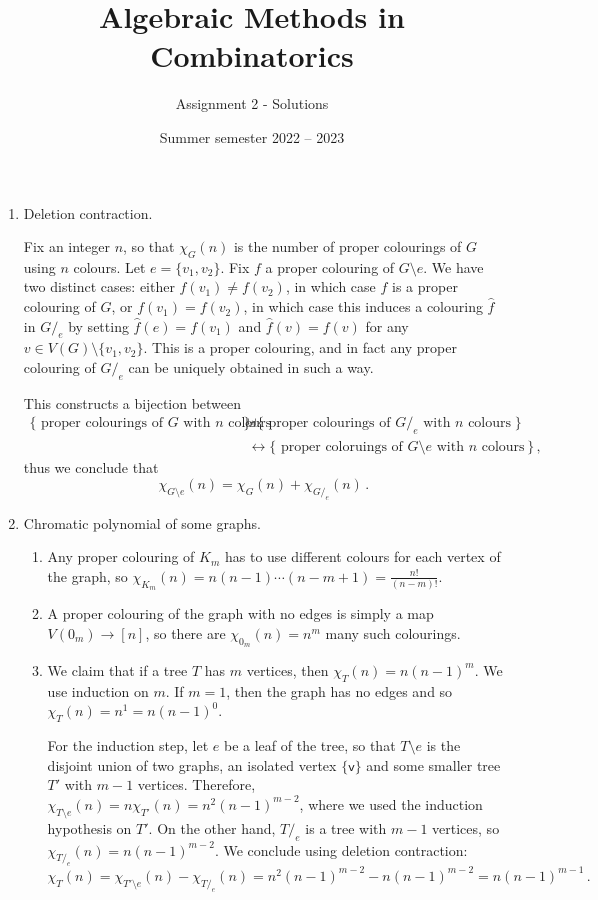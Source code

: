 \documentclass[kulak]{tplt}
\title{Algebraic Methods in Combinatorics}
\author{Assignment 2 - Solutions}
\date{Summer semester 2022 -- 2023}
\theoremstyle{definition}
\newcommand{\vv}{\mathsf{v}}
\begin{document}
\maketitle
\begin{enumerate}
\item Deletion contraction.

Fix an integer $n$, so that $\chi_G(n)$ is the number of proper colourings of $G$ using $n$ colours.
Let $e = \{v_1, v_2\}$.
Fix $f$ a proper colouring of $G\setminus e$.
We have two distinct cases: either $f(v_1) \neq f(v_2)$, in which case $f$ is a proper colouring of $G$, or $f(v_1) = f(v_2)$, in which case this induces a colouring $\hat{f}$ in $G/_e$ by setting $\hat{f}(e) = f(v_1)$ and $\hat{f}(v) = f(v)$ for any $v\in V(G) \setminus \{v_1, v_2\}$.
This is a proper colouring, and in fact any proper colouring of $G/_e$ can be uniquely obtained in such a way.

This constructs a bijection between
\begin{align*}
 \{ \text{ proper colourings of $G$ with $n$ colours }\} &\uplus \{ \text{ proper colourings of $G/_e$ with $n$ colours }\} \\
 &\leftrightarrow \{ \text{ proper coloruings of $G\setminus e$ with $n$ colours }\}\, , 
\end{align*}
thus we conclude that 
$$ \chi_{G\setminus e }(n) = \chi_G(n) + \chi_{G/_e}(n)\, . $$

\item Chromatic polynomial of some graphs.

\begin{enumerate}
\item 
Any proper colouring of $K_m$ has to use different colours for each vertex of the graph, so $\chi_{K_m}(n) = n(n-1) \cdots (n-m+1) = \frac{n!}{(n-m)!}$.

\item 
A proper colouring of the graph with no edges is simply a map $V(0_m) \to [n]$, so there are $\chi_{0_m}(n) = n^m$ many such colourings.


\item 
We claim that if a tree $T$ has $m$ vertices, then $\chi_T(n) = n(n-1)^m$.
We use induction on $m$.
If $m=1$, then the graph has no edges and so $\chi_T(n) = n^1 = n (n-1)^0$.

For the induction step, let $e$ be a leaf of the tree, so that $T\setminus e$ is the disjoint union of two graphs, an isolated vertex $\{\vv\}$ and some smaller tree $T'$ with $m-1$ vertices.
Therefore, $\chi_{T \setminus e}(n) = n \chi_{T'}(n) = n^2(n-1)^{m-2}$, where we used the induction hypothesis on $T'$.
On the other hand, $T/_e$ is a tree with $m-1$ vertices, so $\chi_{T/_e}(n) = n (n-1)^{m-2}$.
We conclude using deletion contraction:
$$\chi_T(n) = \chi_{T'\setminus e}(n) - \chi_{T/_e}(n) = n^2(n-1)^{m-2}  - n(n-1)^{m-2} = n(n-1)^{m-1} \, .  $$



\end{enumerate}
\end{enumerate}
\end{document}
